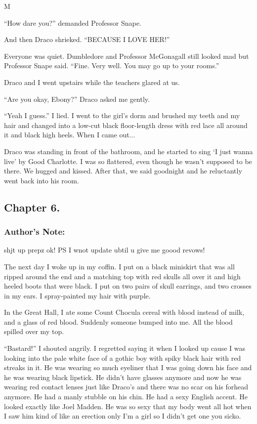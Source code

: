 M\documentclass{article}
\begin{document}
“How dare you?” demanded Professor Snape.

And then Draco shrieked. “BECAUSE I LOVE HER!”

Everyone was quiet. Dumbledore and Professor McGonagall still looked mad but Professor Snape said. “Fine. Very well. You may go up to your rooms.”

Draco and I went upstairs while the teachers glared at us.

“Are you okay, Ebony?” Draco asked me gently.

“Yeah I guess.” I lied. I went to the girl’s dorm and brushed my teeth and my hair and changed into a low-cut black floor-length dress with red lace all around it and black high heels. When I came out...

Draco was standing in front of the bathroom, and he started to sing ‘I just wanna live’ by Good Charlotte. I was so flattered, even though he wasn’t supposed to be there. We hugged and kissed. After that, we said goodnight and he reluctantly went back into his room.

\clearpage\nolinenumbers
\subsection*{Chapter 6.}

\subsubsection*{Author's Note: }shjt up prepz ok! PS I wnot update ubtil u give me goood revows!

\textbreak
\linenumbers\resetlinenumber

The next day I woke up in my coffin. I put on a black miniskirt that was all ripped around the end and a matching top with red skulls all over it and high heeled boots that were black. I put on two pairs of skull earrings, and two crosses in my ears. I spray-painted my hair with purple.

In the Great Hall, I ate some Count Chocula cereal with blood instead of milk, and a glass of red blood. Suddenly someone bumped into me. All the blood spilled over my top.

“Bastard!” I shouted angrily. I regretted saying it when I looked up cause I was looking into the pale white face of a gothic boy with spiky black hair with red streaks in it. He was wearing so much eyeliner that I was going down his face and he was wearing black lipstick. He didn’t have glasses anymore and now he was wearing red contact lenses just like Draco’s and there was no scar on his forhead anymore. He had a manly stubble on his chin. He had a sexy English accent. He looked exactly like Joel Madden. He was so sexy that my body went all hot when I saw him kind of like an erection only I’m a girl so I didn’t get one you sicko.
\end{document}
